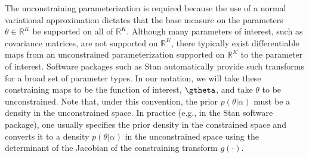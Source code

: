 \documentclass{article}\usepackage[]{graphicx}\usepackage[]{color}
\theoremstyle{definition}
\theoremstyle{plain}
\theoremstyle{plain}
\theoremstyle{plain}
\theoremstyle{definition}
\theoremstyle{plain}
\theoremstyle{plain}
\begin{document}
The unconstraining parameterization is required because the use of
a normal variational approximation dictates that the base measure
on the parameters $\theta\in\mathbb{R}^{K}$ be supported on all of
$\mathbb{R}^{K}$. Although many parameters of interest, such as covariance
matrices, are not supported on $\mathbb{R}^{K}$, there typically
exist differentiable maps from an unconstrained parameterization supported
on $\mathbb{R}^{K}$ to the parameter of interest. Software packages
such as Stan automatically provide such transforms for a broad set
of parameter types.
In our notation, we will take these constraining maps to be the function of
interest, $\gtheta$, and take $\theta$ to be unconstrained.  Note that, under
this convention, the prior $p\left(\theta\vert\alpha\right)$ must be a density
in the unconstrained space.  In practice (e.g., in the Stan software package),
one usually specifies the prior density in the constrained space and converts it
to a density $p\left(\theta\vert\alpha\right)$ in the unconstrained space using
the determinant of the Jacobian of the constraining transform
$g\left(\cdot\right)$.
\end{document}
